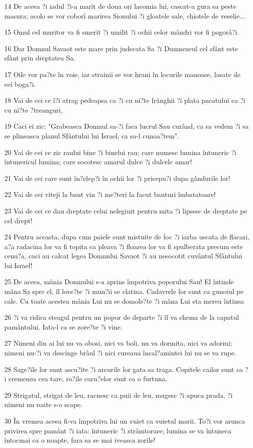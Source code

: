 \par 14 De aceea ?i iadul ?i-a marit de doua ori lacomia lui, cascat-a gura sa peste masura; acolo se vor coborî marirea Sionului ?i gloatele sale, chiotele de veselie...
\par 15 Omul cel muritor va fi smerit ?i umilit ?i ochii celor mândri vor fi pogorâ?i.
\par 16 Dar Domnul Savaot este mare prin judecata Sa ?i Dumnezeul cel sfânt este sfânt prin dreptatea Sa.
\par 17 Oile vor pa?te în voie, iar strainii se vor hrani în locurile manoase, lasate de cei boga?i.
\par 18 Vai de cei ce î?i atrag pedeapsa ca ?i cu ni?te frânghii ?i plata pacatului ca ?i cu ni?te ?treanguri,
\par 19 Caci ei zic: "Grabeasca Domnul sa-?i faca lucrul Sau curând, ca sa vedem ?i sa se plineasca planul Sfântului lui Israel, ca sa-l cunoa?tem".
\par 20 Vai de cei ce zic raului bine ?i binelui rau; care numesc lumina întuneric ?i întunericul lumina; care socotesc amarul dulce ?i dulcele amar!
\par 21 Vai de cei care sunt în?elep?i în ochii lor ?i pricepu?i dupa gândurile lor!
\par 22 Vai de cei viteji la baut vin ?i me?teri la facut bauturi îmbatatoare!
\par 23 Vai de cei ce dau dreptate celui nelegiuit pentru mita ?i lipsesc de dreptate pe cel drept!
\par 24 Pentru aceasta, dupa cum paiele sunt mistuite de foc ?i iarba uscata de flacari, a?a radacina lor va fi topita ca pleava ?i floarea lor va fi spulberata precum este cenu?a, caci au calcat legea Domnului Savaot ?i au nesocotit cuvântul Sfântului lui Israel!
\par 25 De aceea, mânia Domnului s-a aprins împotriva poporului Sau! El întinde mâna Sa spre el, îl love?te ?i mun?ii se clatina. Cadavrele lor sunt ca gunoiul pe cale. Cu toate acestea mânia Lui nu se domole?te ?i mâna Lui sta mereu întinsa
\par 26 ?i va ridica steagul pentru un popor de departe ?i îl va chema de la capatul pamântului. Iata-l ca se zore?te ?i vine.
\par 27 Nimeni din ai lui nu va obosi, nici va boli, nu va dormita, nici va adormi; nimeni nu-?i va descinge brâul ?i nici cureaua încal?amintei lui nu se va rupe.
\par 28 Sage?ile lor sunt ascu?ite ?i arcurile lor gata sa traga. Copitele cailor sunt ca ?i cremenea cea tare, ro?ile caru?elor sunt ca o furtuna.
\par 29 Strigatul, strigat de leu, racnesc ca puii de leu, mugesc ?i apuca prada, ?i nimeni nu roate s-o scape.
\par 30 În vremea aceea fi-va împotriva lui un vuiet ca vuietul marii. To?i vor arunca privirea spre pamânt ?i iata: întuneric ?i strâmtorare; lumina se va întuneca întocmai ca o noapte, fara sa se mai iveasca zorile!

